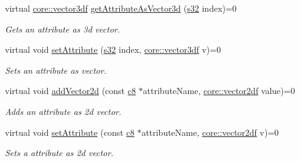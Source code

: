 \begin{DoxyCompactItemize}
virtual \hyperlink{namespaceirr_1_1core_ae6e2b2a6c552833ebbd5b7463d03586b}{core\+::vector3df} \hyperlink{classirr_1_1io_1_1IAttributes_a7ff94072381cac9912d73c9c6c77c6ce}{get\+Attribute\+As\+Vector3d} (\hyperlink{namespaceirr_ac66849b7a6ed16e30ebede579f9b47c6}{s32} index)=0
\begin{DoxyCompactList}\small\item\em Gets an attribute as 3d vector. \end{DoxyCompactList}\item 
\mbox{\label{classirr_1_1io_1_1IAttributes_ac042bda6760e9adcfd967b0046d55d20}} 
virtual void \hyperlink{classirr_1_1io_1_1IAttributes_ac042bda6760e9adcfd967b0046d55d20}{set\+Attribute} (\hyperlink{namespaceirr_ac66849b7a6ed16e30ebede579f9b47c6}{s32} index, \hyperlink{namespaceirr_1_1core_ae6e2b2a6c552833ebbd5b7463d03586b}{core\+::vector3df} v)=0
\begin{DoxyCompactList}\small\item\em Sets an attribute as vector. \end{DoxyCompactList}\item 
\mbox{\label{classirr_1_1io_1_1IAttributes_a515026d0bfa5c984cb2b0799b9468803}} 
virtual void \hyperlink{classirr_1_1io_1_1IAttributes_a515026d0bfa5c984cb2b0799b9468803}{add\+Vector2d} (const \hyperlink{namespaceirr_a9395eaea339bcb546b319e9c96bf7410}{c8} $\ast$attribute\+Name, \hyperlink{namespaceirr_1_1core_a116f90bd31515724b6235014ee2b74d5}{core\+::vector2df} value)=0
\begin{DoxyCompactList}\small\item\em Adds an attribute as 2d vector. \end{DoxyCompactList}\item 
\mbox{\label{classirr_1_1io_1_1IAttributes_a51c9f7fbc0d26fd4123a5cf3d6059f4d}} 
virtual void \hyperlink{classirr_1_1io_1_1IAttributes_a51c9f7fbc0d26fd4123a5cf3d6059f4d}{set\+Attribute} (const \hyperlink{namespaceirr_a9395eaea339bcb546b319e9c96bf7410}{c8} $\ast$attribute\+Name, \hyperlink{namespaceirr_1_1core_a116f90bd31515724b6235014ee2b74d5}{core\+::vector2df} v)=0
\begin{DoxyCompactList}\small\item\em Sets a attribute as 2d vector. \end{DoxyCompactList}\item 

\end{DoxyCompactItemize}
